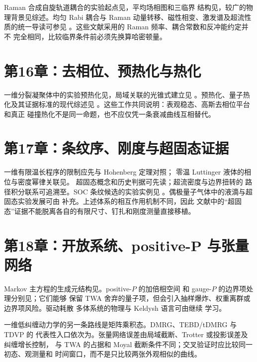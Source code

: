 Raman 合成自旋轨道耦合的实验起点见\cite{Lin2011}，平均场相图和三临界
结构见\cite{Li2012}，较广的物理背景见综述\cite{Zhai2015}。均匀 Rabi
耦合与 Raman 动量转移、磁性相变、激发谱及超流性质的统一导读可参见
\cite{Recati2022}。这些文献采用的 Raman 频率、耦合常数和反冲能约定并不
完全相同，比较临界条件前必须先换算哈密顿量。

\section{第16章：去相位、预热化与热化}

一维分裂凝聚体中的实验预热化见\cite{Gring2012}，局域关联的光锥式建立见
\cite{Langen2013}。预热化、量子热化及其证据标准的现代综述见
\cite{Ueda2020}。这些工作共同说明：表观稳态、高斯去相位平台和真正
碰撞热化不是同一命题，也不应仅凭一条衰减曲线互相替代。

\section{第17章：条纹序、刚度与超固态证据}

一维有限温长程序的限制应先与 Hohenberg 定理\cite{Hohenberg1967}对照；
零温 Luttinger 液体的相位与密度幂律关联见\cite{Haldane1981,Cazalilla2004}。
超固态概念和历史判据可先读\cite{Boninsegni2012}；超流密度与边界扭转的
路径积分联系可追溯至\cite{Pollock1987}。SOC 条纹候选的实验实例见
\cite{Li2017}。偶极量子气体中的液滴与超固态实验发展可由
\cite{Bottcher2021,Chomaz2023}补充。上述体系的相互作用机制不同，因此
文献中的“超固态”证据不能脱离各自的有限尺寸、钉扎和刚度测量直接移植。

\section{第18章：开放系统、positive-P 与张量网络}

Markov 主方程的生成元结构见\cite{Lindblad1976}。positive-$P$ 的加倍相空间
和 gauge-$P$ 的边界项处理分别见\cite{Drummond1980,Deuar2002}；它们能够
保留 TWA 舍弃的量子项，但会引入抽样爆炸、权重离群或边界项风险。驱动耗散
多体系统的物理与 Keldysh 语言可由\cite{Carusotto2013,Sieberer2016}继续
学习。

一维低纠缠动力学的另一条路线是矩阵乘积态。DMRG、TEBD/tDMRG 与 TDVP 的
代表性入口依次为\cite{White1992,Vidal2003,Schollwock2011,Daley2004,
Haegeman2011}。张量网络误差由局域截断、Trotter 或投影误差及纠缠增长控制，
与 TWA 的占据和 Moyal 截断条件不同；交叉验证时应比较同一初态、观测量和
时间窗口，而不是只比较两张外观相似的曲线。
